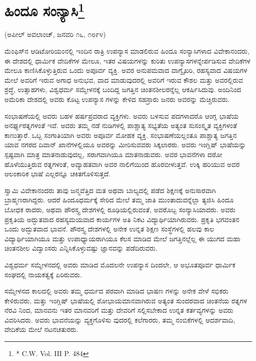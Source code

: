 \delimiter


\section{ಹಿಂದೂ ಸಂನ್ಯಾಸಿ\protect\footnote{* C.W. Vol. III P. 484}}

\begin{center}
(ಅಪೀಲ್​ ಅವಲಾಂಚ್​, ಜನವರಿ ೧೬, ೧೮೯೪)
\end{center}

ಮೆಂಫಿಸ್​ನ ಆಡಿಟೋರಿಯಂನಲ್ಲಿ ಇಂದಿನ ರಾತ್ರಿ ಉಪನ್ಯಾಸ ಮಾಡಲಿರುವ ಹಿಂದೂ ಸಂನ್ಯಾಸಿಗಳಾದ ವಿವೇಕಾನಂದರು, ಈ ದೇಶದಲ್ಲಿ ಧಾರ್ಮಿಕ ವೇದಿಕೆಗಳ ಮೇಲೂ, ಇತರ ವಿಷಯಗಳನ್ನು ಕುರಿತು ಉಪನ್ಯಾಸಗಳನ್ನೇರ್ಪಡಿಸುವ ವೇದಿಕೆಗಳ ಮೇಲೂ ಕಾಣಿಸಿಕೊಳ್ಳುತ್ತಿರುವ ಒಂದು ಅಪೂರ್ವ ವ್ಯಕ್ತಿ. ಅವರ ಅನುಪಮವಾದ ವಾಗ್ವೈಖರಿ, ರಹಸ್ಯವಾದ ವಿಷಯಗಳ ಮೇಲೆ ಅವರಿಗೆ ಇರುವ ಅಗಾಧ ಅನುಭವ, ವಾದ ಮಾಡುವುದರಲ್ಲಿ ಅವರಿಗೆ ಇರುವ ಕೌಶಲ ಮತ್ತು ಅವರಲ್ಲಿರುವ ಶ್ರದ್ಧೆ, ಉತ್ಸಾಹಗಳು, ವಿಶ್ವಧರ್ಮ ಸಮ್ಮೇಳನಕ್ಕೆ ಬಂದಿದ್ದ ಜಗತ್ತಿನ ಚಿಂತನಶೀಲರನ್ನೆಲ್ಲ ಆಕರ್ಷಿಸಿದುವು. ಅಂದಿನಿಂದ ಅಮೆರಿಕಾ ದೇಶದಲ್ಲಿ ಅವರು ಕೊಟ್ಟ ಉಪನ್ಯಾಸ ಗಳನ್ನು ಕೇಳಿದ ಸಹಸ್ರಾರು ಜನರು ಅವರನ್ನು ಮೆಚ್ಚಿರುವರು.

ಸಂಭಾಷಣೆಯಲ್ಲಿ ಅವರು ಬಹಳ ಹರ್ಷಪ್ರದರಾದ ವ್ಯಕ್ತಿಗಳು. ಅವರು ಬಳಸುವ ಪದಗಳಾದರೊ ಆಂಗ್ಲ ಭಾಷೆಯ ಅನರ್ಘ್ಯರತ್ನಗಳಂತೆ ಇವೆ. ಅವರು ತಮ್ಮ ನಡೆ ನುಡಿಗಳಲ್ಲಿ ಪಾಶ್ಚಾತ್ಯ ಸಭ್ಯತೆಯ ಅತ್ಯಂತ ಸುಸಂಸ್ಕೃತ ವ್ಯಕ್ತಿಗಳಂತೆ ಕಾಣುತ್ತಾರೆ. ಒಬ್ಬ ಸಂಗಾತಿಯಾಗಿ ಅವರು ಅಪೂರ್ವ ಮೋಹಕ ವ್ಯಕ್ತಿ. ಸಂಭಾಷಣೆಯಲ್ಲಂತೂ ಪಾಶ್ಚಾತ್ಯ ಜಗತ್ತಿನ ಯಾವ ನಗರದ ದಿವಾನ್​ ಖಾನೆಗಳಲ್ಲಿಯೂ ಅವರನ್ನು ಮೀರಿಸುವವರು ಸಿಕ್ಕಲಾರರು. ಅವರು ಇಂಗ್ಲಿಷ್​ ಭಾಷೆಯನ್ನು ಸ್ಪಷ್ಟವಾಗಿ ಮಾತ್ರ ಮಾತನಾಡುವುದಲ್ಲ, ಸರಾಗವಾಗಿಯೂ ಮಾತನಾಡುವರು. ಅವರ ಭಾವನೆಗಳಾ ದರೋ ಹೊಳೆಯುತ್ತಿರುವ ರತ್ನಗಳಂತೆ, ಅವ್ಯಾಹತವಾಗಿ ಅವರ ನಾಲಿಗೆಯಿಂದ ಹೊರಬೀಳುತ್ತವೆ. ಉಕ್ಕಿ ಹರಿಯುವ ಅವರ ಆಲಂಕಾರಿಕ ಭಾಷೆ ಎಲ್ಲರನ್ನೂ ಚಕಿತಗೊಳಿಸುತ್ತದೆ.

ಸ್ವಾಮಿ ವಿವೇಕಾನಂದರು ತಾವು ಜನ್ಮವೆತ್ತಿದ ಮತ ಅಥವಾ ಬಾಲ್ಯದಲ್ಲಿ ಪಡೆದ ಶಿಕ್ಷಣಕ್ಕೆ ಅನುಸಾರವಾಗಿ ಬ್ರಾಹ್ಮಣರಾಗಿದ್ದರು. ಆದರೆ ಹಿಂದೂಧರ್ಮಕ್ಕೆ ಸೇರಿದ ಮೇಲೆ ತಮ್ಮ ಜಾತಿ ಮುಂತಾದುವನ್ನೆಲ್ಲಾ ತ್ಯಜಿಸಿ ಹಿಂದೂ ಬೋಧಕ ರಾದರು, ಅಥವಾ ಪೌರಸ್ತ್ಯ ದೇಶಗಳಲ್ಲಿ ರೂಢಿಯಲ್ಲಿರುವಂತೆ, ಅವರೊಬ್ಬ ಸಂನ್ಯಾಸಿಯಾದರು. ಅವರು ಪ್ರಕೃತಿಯ ಅದ್ಭುತವಾದ ರಹಸ್ಯಮಯವಾದ ಕಾರ್ಯಗಳ ಅತಿ ನಿಕಟ ವಿದ್ಯಾರ್ಥಿಯಾಗಿರುವರು. ಪ್ರಕೃತಿ ಭಗವಂತನ ಒಂದು ಅದ್ಭುತವಾದ ಭಾವನೆ. ಪೌರಸ್ತ್ಯ ದೇಶಗಳಲ್ಲಿ ಅನೇಕ ಉನ್ನತ ಶಿಕ್ಷಣ ಸಂಸ್ಥೆಗಳಲ್ಲಿ ಹಲವು ಕಾಲ ವಿದ್ಯಾರ್ಥಿಯಾಗಿಯೂ ಮತ್ತು ಉಪಾಧ್ಯಾಯರಾಗಿಯೂ ಕೆಲಸ ಮಾಡಿದ ಮೇಲೆ ಜಗತ್ತಿನಲ್ಲೆಲ್ಲ ಈ ಯುಗದ ಮಹಾ ಚಿಂತನಶೀಲ ವಿದ್ವಾಂಸರು ಎನ್ನಿಸಿಕೊಳ್ಳುವಷ್ಟು ಜ್ಞಾನವನ್ನು ಪಡೆದಿರುವರು.

ವಿಶ್ವಧರ್ಮ ಸಮ್ಮೇಳನದಲ್ಲಿ ಅವರು ಮಾಡಿದ ಮೊದಲನೇ ಉಪನ್ಯಾಸ ದಿಂದಲೇ, ಆ ಅಭೂತಪೂರ್ವ ಧಾರ್ಮಿಕ ಸಂಘದಲ್ಲಿ ನಾಯಕತ್ವಕ್ಕೆ ಏರಿರುವರು.

ಸಮ್ಮೇಳನದ ಕಾಲದಲ್ಲಿ ಅವರು ತಮ್ಮ ಧರ್ಮದ ಪರವಾಗಿ ಮಾಡಿದ ಭಾಷಣ ಗಳನ್ನು ಅನೇಕ ವೇಳೆ ಸಭಿಕರು ಕೇಳಿರುವರು, ಮತ್ತು ಇಂಗ್ಲಿಷ್​ ಭಾಷೆಯಲ್ಲಿ ಶೋಭಾಯಮಾನವಾಗಿರುವ ಅತ್ಯಂತ ಸುಂದರವಾದ ಚಿಂತನೆಯ ರತ್ನಗಳ ನೆರವಿ ನಿಂದ, ಮಾನವನು ಇತರ ಮಾನವರಿಗೆ ಮತ್ತು ದೇವರಿಗೆ ಸಲ್ಲಿಸಬೇಕಾದ ಉನ್ನತ ಕರ್ತವ್ಯಗಳನ್ನು ಅವರು ವಿವರಿಸಿದರು. ಅವರು ಭಾವನೆಯನ್ನು ವ್ಯಕ್ತಗೊಳಿಸು ವುದರಲ್ಲಿ ಕಲೆಗಾರರು, ತಮ್ಮ ನಂಬಿಕೆಗಳಲ್ಲಿ ಆದರ್ಶವಾದಿ, ವೇದಿಕೆಯ ಮೇಲೆ ನಟನಚತುರರು.

